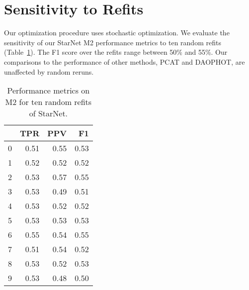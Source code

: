 \section{Sensitivity to Refits}
\label{sec:refits}

Our optimization procedure uses stochastic optimization. 
We evaluate the sensitivity of our StarNet M2 performance metrics to ten random refits (Table~\ref{tab:refits}). 
The F1 score over the refits range
between 50\% and 55\%. Our comparisons 
to the performance of other methods, PCAT and DAOPHOT, 
are unaffected by random reruns. 

\begin{table}
\centering
\begin{tabular}{lrrr}
\toprule
 &       TPR &       PPV &        F1 \\
\midrule
0 &  0.51 &  0.55 &  0.53 \\
1 &  0.52 &  0.52 &  0.52 \\
2 &  0.53 &  0.57 &  0.55 \\
3 &  0.53 &  0.49 &  0.51 \\
4 &  0.53 &  0.52 &  0.52 \\
5 &  0.53 &  0.53 &  0.53 \\
6 &  0.55 &  0.54 &  0.55 \\
 7 &  0.51 &  0.54 &  0.52 \\
8 &  0.53 &  0.52 &  0.53 \\
9 &  0.53 &  0.48 &  0.50 \\
\bottomrule
\end{tabular}
\caption{Performance metrics on M2 for ten random refits of StarNet. }
\label{tab:refits}
\end{table}
